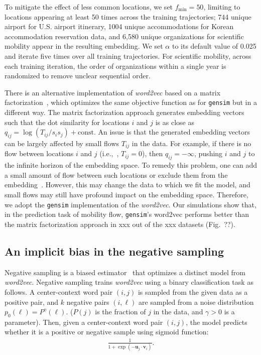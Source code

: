 \documentclass[12pt]{article} %
\def\ie{i.e.,~}
\begin{document}
To mitigate the effect of less common locations, we set $f_{\min} = 50$, limiting to locations appearing at least 50 times across the training trajectories;
744 unique airport for U.S. airport itinerary, 1004 unique accommodations for Korean accommodation reservation data, and 6,580 unique organizations for scientific mobility appear in the resulting embedding.
We set $\alpha$ to its default value of 0.025 and iterate five times over all training trajectories.
For scientific mobility, across each training iteration, the order of organizations within a single year is randomized to remove unclear sequential order.

There is an alternative implementation of \textit{word2vec} based on a matrix factorization~\cite{levy2014neural,Qiu2018}, which optimizes the same objective function as for \texttt{gensim} but in a different way.
The matrix factorization approach generates embedding vectors such that the dot similarity for locations $i$ and $j$ is as close as $q_{ij}= \log(T_{ij} / s_i s_j) + \text{const}$.
An issue is that the generated embedding vectors can be largely affected by small flows $T_{ij}$ in the data.
For example, if there is no flow between locations $i$ and $j$ (\ie, $T_{ij} = 0$), then $q_{ij} = -\infty$, pushing $i$ and $j$ to the infinite horizon of the embedding space.
To remedy this problem, one can add a small amount of flow between such locations or exclude them from the embedding~\cite{levy2014neural,Qiu2018}.
However, this may change the data to which we fit the model, and small flows may still have profound impact on the embedding space.
Therefore, we adopt the \texttt{gensim} implementation of the \textit{word2vec}.
Our simulations show that, in the prediction task of mobility flow, \texttt{gensim}'s word2vec performs better than the matrix factorization approach in xxx out of the xxx datasets (Fig.~??).


\subsection*{An implicit bias in the negative sampling}
\label{sec:sg_and_word2vec}

Negative sampling is a biased estimator~\autocite{Chia2010,Dyer2014} that optimizes a distinct model  from {\it word2vec}.
Negative sampling trains {\it word2vec} using a binary classification task as follows.
A center-context word pair $(i,j)$ is sampled from the given data as a positive pair, and $k$ negative pairs $(i,\ell)$ are sampled from a noise distribution $p_0(\ell)=P^\gamma(\ell)$. ($P(j)$ is the fraction of $j$ in the data, and $\gamma>0$ is a parameter).
Then, given a center-context word pair $(i,j)$, the model predicts whether it is a positive or negative sample using sigmoid function:
\begin{align}
	\label{eq:sigmoid}
	\frac{1}{1 + \exp\left( - \bm{u}_j \cdot \bm{v}_i \right)}.
\end{align}
\end{document}
